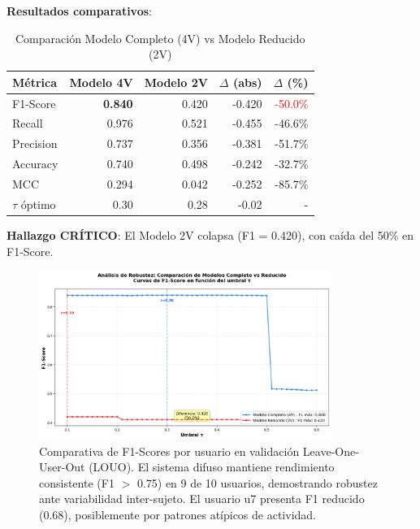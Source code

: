 \documentclass[12pt,letterpaper,twoside]{report}
\begin{document}
\begin{calculobox}
\textbf{Resultados comparativos}:

\begin{table}[H]
\centering
\caption{Comparación Modelo Completo (4V) vs Modelo Reducido (2V)}
\label{tab:robustness_4v_2v}
\begin{tabular}{@{}lrrrr@{}}
\toprule
\textbf{Métrica} & \textbf{Modelo 4V} & \textbf{Modelo 2V} & \textbf{$\Delta$ (abs)} & \textbf{$\Delta$ (\%)} \\
\midrule
F1-Score         & \textbf{0.840} & 0.420 & -0.420 & \textcolor{red}{-50.0\%} \\
Recall           & 0.976          & 0.521 & -0.455 & -46.6\% \\
Precision        & 0.737          & 0.356 & -0.381 & -51.7\% \\
Accuracy         & 0.740          & 0.498 & -0.242 & -32.7\% \\
MCC              & 0.294          & 0.042 & -0.252 & -85.7\% \\
$\tau$ óptimo    & 0.30           & 0.28  & -0.02  & - \\
\bottomrule
\end{tabular}
\end{table}

\textbf{Hallazgo CRÍTICO}: El Modelo 2V colapsa (F1 = 0.420), con caída del 50\% en F1-Score.
\end{calculobox}

\begin{figure}[htbp]
\centering
\includegraphics[width=0.85\textwidth]{figuras/comparativa_f1_scores.png}
\caption{Comparativa de F1-Scores por usuario en validación Leave-One-User-Out (LOUO). El sistema difuso mantiene rendimiento consistente (F1 $>$ 0.75) en 9 de 10 usuarios, demostrando robustez ante variabilidad inter-sujeto. El usuario u7 presenta F1 reducido (0.68), posiblemente por patrones atípicos de actividad.}
\label{fig:comparativa_f1_louo}
\end{figure}
\end{document}
